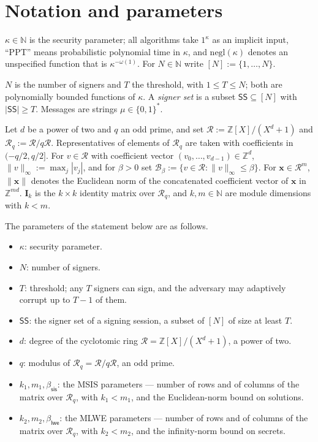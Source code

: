 \documentclass{aicr-conjecture}
\newcommand{\NN}{\mathbb{N}}
\newcommand{\ZZ}{\mathbb{Z}}
\newcommand{\SSet}{\mathsf{SS}}
\newcommand{\negl}{\mathrm{negl}}
\newcommand{\Rr}{\mathcal{R}}
\newcommand{\Rq}{\mathcal{R}_q}
\newcommand{\Ball}{\mathcal{B}}
\newcommand{\bsis}{\beta_{\mathsf{sis}}}
\newcommand{\blwe}{\beta_{\mathsf{lwe}}}
\newcommand{\bx}{\mathbf{x}}
\newcommand{\bI}{\mathbf{I}}
\begin{document}
\section{Notation and parameters}\label{sec:notation}

$\kappa \in \NN$ is the security parameter; all algorithms take
$1^{\kappa}$ as an implicit input, ``PPT'' means probabilistic
polynomial time in $\kappa$, and $\negl(\kappa)$ denotes an unspecified
function that is $\kappa^{-\omega(1)}$. For $N \in \NN$ write
$[N] := \{1, \dots, N\}$.

$N$ is the number of signers and $T$ the threshold, with
$1 \le T \le N$; both are polynomially bounded functions of $\kappa$. A
\emph{signer set} is a subset $\SSet \subseteq [N]$ with
$|\SSet| \ge T$. Messages are strings $\mu \in \{0,1\}^{*}$.

Let $d$ be a power of two and $q$ an odd prime, and set
$\Rr := \ZZ[X]/(X^{d}+1)$ and $\Rq := \Rr/q\Rr$. Representatives of
elements of $\Rq$ are taken with coefficients in $(-q/2, q/2]$. For
$v \in \Rr$ with coefficient vector
$(v_0, \dots, v_{d-1}) \in \ZZ^{d}$, $\|v\|_\infty := \max_j |v_j|$,
and for $\beta > 0$ set
$\Ball_\beta := \{v \in \Rr : \|v\|_\infty \le \beta\}$. For
$\bx \in \Rr^{m}$, $\|\bx\|$ denotes the Euclidean norm of the
concatenated coefficient vector of $\bx$ in $\ZZ^{md}$. $\bI_k$ is the
$k \times k$ identity matrix over $\Rq$, and $k, m \in \NN$ are module
dimensions with $k < m$.

The parameters of the statement below are as follows.

\begin{itemize}[leftmargin=1.2em]
  \item $\kappa$: security parameter.
  \item $N$: number of signers.
  \item $T$: threshold; any $T$ signers can sign, and the adversary may
  adaptively corrupt up to $T-1$ of them.
  \item $\SSet$: the signer set of a signing session, a subset of $[N]$
  of size at least $T$.
  \item $d$: degree of the cyclotomic ring $\Rr = \ZZ[X]/(X^{d}+1)$, a
  power of two.
  \item $q$: modulus of $\Rq = \Rr/q\Rr$, an odd prime.
  \item $k_1, m_1, \bsis$: the MSIS parameters --- number of rows and
  of columns of the matrix over $\Rq$, with $k_1 < m_1$, and the
  Euclidean-norm bound on solutions.
  \item $k_2, m_2, \blwe$: the MLWE parameters --- number of rows and
  of columns of the matrix over $\Rq$, with $k_2 < m_2$, and the
  infinity-norm bound on secrets.
\end{itemize}
\end{document}
